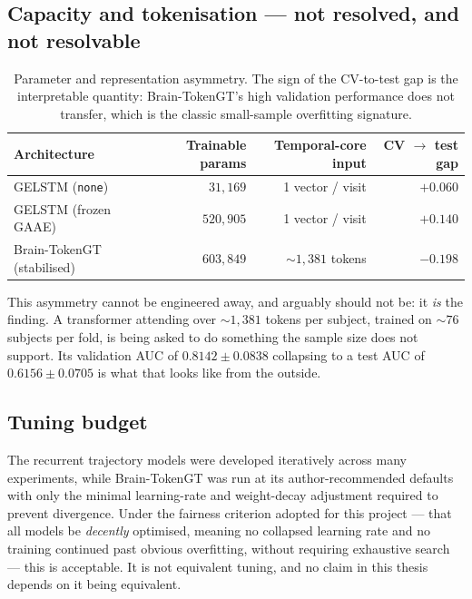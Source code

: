 \subsection{Capacity and tokenisation --- not resolved, and not resolvable}

\begin{table}[htbp]
  \centering
  \small
  \begin{tabular}{@{}lrrr@{}}
    \toprule
    \textbf{Architecture} & \textbf{Trainable params} & \textbf{Temporal-core input} & \textbf{CV $\rightarrow$ test gap} \\
    \midrule
    GELSTM (\texttt{none})   & $31{,}169$  & 1 vector / visit       & $+0.060$ \\
    GELSTM (frozen GAAE)     & $520{,}905$ & 1 vector / visit       & $+0.140$ \\
    Brain-TokenGT (stabilised) & $603{,}849$ & ${\sim}1{,}381$ tokens & $-0.198$ \\
    \bottomrule
  \end{tabular}
  \caption{Parameter and representation asymmetry. The sign of the CV-to-test gap is the
    interpretable quantity: Brain-TokenGT's high validation performance does not transfer,
    which is the classic small-sample overfitting signature.}
  \label{tab:capacity}
\end{table}

This asymmetry cannot be engineered away, and arguably should not be: it \emph{is} the
finding. A transformer attending over ${\sim}1{,}381$ tokens per subject, trained on ${\sim}76$
subjects per fold, is being asked to do something the sample size does not support. Its
validation AUC of $0.8142 \pm 0.0838$ collapsing to a test AUC of $0.6156 \pm 0.0705$ is
what that looks like from the outside.

\subsection{Tuning budget}

The recurrent trajectory models were developed iteratively across many experiments, while
Brain-TokenGT was run at its author-recommended defaults with only the minimal
learning-rate and weight-decay adjustment required to prevent divergence. Under the
fairness criterion adopted for this project --- that all models be \emph{decently}
optimised, meaning no collapsed learning rate and no training continued past obvious
overfitting, without requiring exhaustive search --- this is acceptable. It is not
equivalent tuning, and no claim in this thesis depends on it being equivalent.

